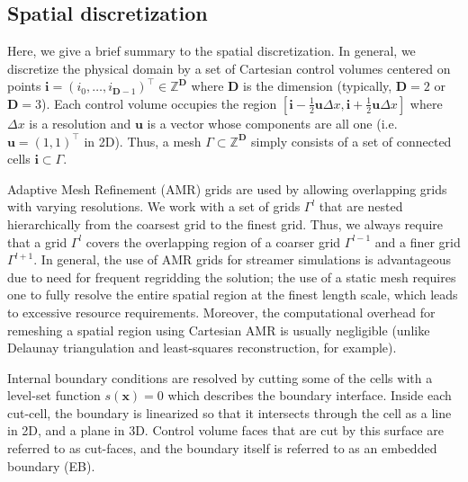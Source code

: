 \documentclass[3p]{elsarticle}
\begin{document}
\subsection{Spatial discretization}
Here, we give a brief summary to the spatial discretization. In general, we discretize the physical domain by a set of Cartesian control volumes centered on points $\bm{i} = (i_0, \ldots, i_{\bm{D}-1})^\intercal \in \mathbb{Z}^{\bm{D}}$ where $\bm{D}$ is the dimension (typically, $\bm{D} = 2$ or $\bm{D} = 3$). Each control volume occupies the region $[\bm{i} - \frac{1}{2}\bm{u}\Delta x, \bm{i} + \frac{1}{2}\bm{u}\Delta x]$ where $\Delta x$ is a resolution and $\bm{u}$ is a vector whose components are all one (i.e. $\bm{u} = (1,1)^\intercal$ in 2D). Thus, a mesh $\Gamma\subset \mathbb{Z}^{\bm{D}}$ simply consists of a set of connected cells $\bm{i} \subset \Gamma$. 


Adaptive Mesh Refinement (AMR) grids are used by allowing overlapping grids with varying resolutions. We work with a set of grids $\Gamma^l$ that are nested hierarchically from the coarsest grid to the finest grid. Thus, we always require that a grid $\Gamma^l$ covers the overlapping region of a coarser grid $\Gamma^{l-1}$ and a finer grid $\Gamma^{l+1}$. In general, the use of AMR grids for streamer simulations is advantageous due to need for frequent regridding the solution; the use of a static mesh requires one to fully resolve the entire spatial region at the finest length scale, which leads to excessive resource requirements. Moreover, the computational overhead for remeshing a spatial region using Cartesian AMR is usually negligible (unlike Delaunay triangulation and least-squares reconstruction, for example). 

Internal boundary conditions are resolved by cutting some of the cells with a level-set function $s(\bm{x}) = 0$ which describes the boundary interface. Inside each cut-cell, the boundary is linearized so that it intersects through the cell as a line in 2D, and a plane in 3D. Control volume faces that are cut by this surface are referred to as cut-faces, and the boundary itself is referred to as an embedded boundary (EB). 
\end{document}
